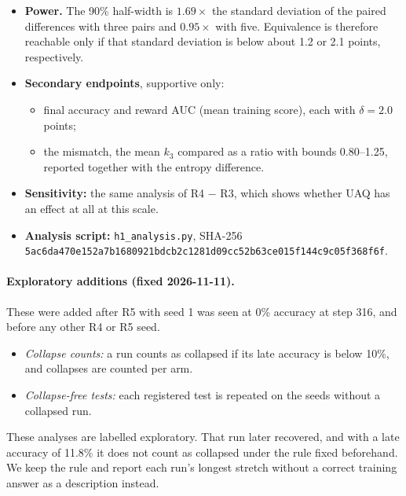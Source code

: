 \begin{itemize}[leftmargin=*,itemsep=2pt]
\item \textbf{Power.} The 90\% half-width is $1.69\times$ the standard deviation of the paired differences with three pairs and $0.95\times$ with five. Equivalence is therefore reachable only if that standard deviation is below about 1.2 or 2.1 points, respectively.
\item \textbf{Secondary endpoints}, supportive only:
  \begin{itemize}[leftmargin=*,itemsep=1pt]
  \item final accuracy and reward AUC (mean training score), each with $\delta=2.0$ points;
  \item the mismatch, the mean $k_3$ compared as a ratio with bounds 0.80--1.25, reported together with the entropy difference.
  \end{itemize}
\item \textbf{Sensitivity:} the same analysis of R4 $-$ R3, which shows whether UAQ has an effect at all at this scale.
\item \textbf{Analysis script:} \texttt{h1\_analysis.py}, SHA-256 \nolinkurl{5ac6da470e152a7b1680921bdcb2c1281d09cc52b63ce015f144c9c05f368f6f}.
\end{itemize}

\paragraph{Exploratory additions (fixed 2026-11-11).} These were added after R5 with seed 1 was seen at 0\% accuracy at step 316, and before any other R4 or R5 seed.
\begin{itemize}[leftmargin=*,itemsep=1pt]
\item \emph{Collapse counts:} a run counts as collapsed if its late accuracy is below 10\%, and collapses are counted per arm.
\item \emph{Collapse-free tests:} each registered test is repeated on the seeds without a collapsed run.
\end{itemize}
These analyses are labelled exploratory. That run later recovered, and with a late accuracy of 11.8\% it does not count as collapsed under the rule fixed beforehand. We keep the rule and report each run's longest stretch without a correct training answer as a description instead.

